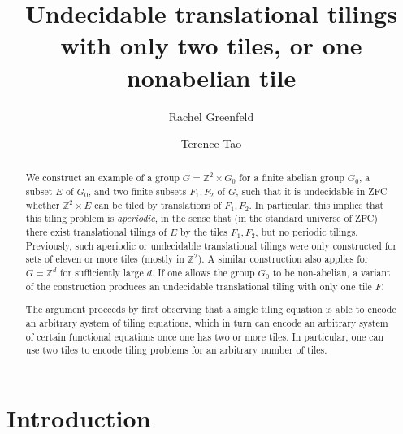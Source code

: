 \documentclass[reqno,a4paper,12pt]{amsart}
\numberwithin{equation}{section}
\numberwithin{figure}{section}
\def\Z{\mathbb{Z}}
\theoremstyle{plain}
\theoremstyle{definition}
\begin{document}
	
	
	\title[Undecidable tilings with only two tiles]
	{Undecidable translational tilings with only two tiles, or one nonabelian tile}
	
	\author{Rachel Greenfeld}
	\address{UCLA Department of Mathematics, Los Angeles, CA 90095-1555.}
	\author{Terence Tao}
	\address{UCLA Department of Mathematics, Los Angeles, CA 90095-1555.}
	
	
	
	
	
	\subjclass[]{}
	\date{}
	
	\keywords{}
	
	\begin{abstract} We construct an example of a group $G = \Z^2 \times G_0$ for a finite abelian group $G_0$, a subset $E$ of $G_0$, and two finite subsets $F_1,F_2$ of $G$, such that it is undecidable in ZFC whether $\Z^2\times E$ can be tiled by translations of $F_1,F_2$.  In particular, this implies that this tiling problem is \emph{aperiodic}, in the sense that (in the standard universe of ZFC) there exist translational tilings of $E$ by the tiles $F_1,F_2$, but no periodic tilings.  Previously, such aperiodic or undecidable translational tilings were only constructed for sets of eleven or more tiles (mostly in $\Z^2$).  A similar construction also applies for $G = \Z^d$ for sufficiently large $d$.  If one allows the group $G_0$ to be non-abelian, a variant of the construction produces an undecidable translational tiling with only one tile $F$.
		
	The argument proceeds by first observing that a single tiling equation is able to encode an arbitrary system of tiling equations, which in turn can encode an arbitrary system of certain functional equations once one has two or more tiles.  In particular, one can use two tiles to encode tiling problems for an arbitrary number of tiles.
	\end{abstract}
	
	

	
	
	\maketitle
	
	
\section{Introduction}
\end{document}
